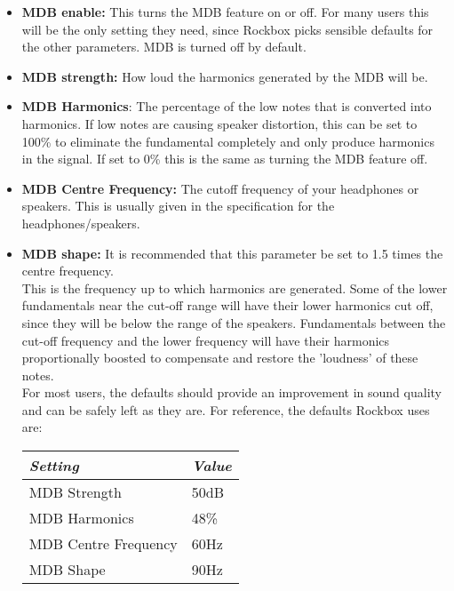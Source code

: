 \begin{itemize}
\begin{itemize}
\item \textbf{MDB enable: } This turns the MDB feature on or off.  For many
users this will be the only setting they need, since Rockbox picks
sensible defaults for the other parameters.  MDB is turned off by
default.
\item \textbf{MDB strength:} How loud the harmonics generated by the MDB will
be.
\item \textbf{MDB Harmonics}: The percentage of the low notes that is
converted into harmonics.  If low notes are causing speaker distortion,
this can be set to 100\% to eliminate the fundamental completely and
only produce harmonics in the signal.  If set to 0\% this is the same
as turning the MDB feature off.
\item \textbf{MDB Centre Frequency: }The cutoff frequency of your headphones or speakers.  This is usually given in the specification for the headphones/speakers.
\item \textbf{MDB shape: }It is recommended that this parameter be set to 1.5
times the centre frequency.\\

This is the frequency up to which harmonics are generated.  Some of the
lower fundamentals near the cut{}-off range
will have their lower harmonics cut off, since they will be below the
range of the speakers. Fundamentals between the
cut{}-off frequency and the lower frequency will have their harmonics proportionally boosted to compensate and restore the 'loudness' of these
notes.\\

For most users, the defaults should provide an improvement in sound
quality and can be safely left as they are.  For reference, the
defaults Rockbox uses are:


\begin{tabular}[c]{|p{4.5290003cm}|p{1.56cm}|}
\hline
{\centering\bfseries\itshape
Setting 
\par}
&
{\centering\bfseries\itshape
Value 
\par}
\\\hline
{\centering\upshape
MDB Strength 
\par}
&
50dB 
\\\hline
{\centering\upshape
MDB Harmonics 
\par}
&
48\% 
\\\hline
{\centering\upshape
MDB Centre Frequency 
\par}
&
60Hz 
\\\hline
{\centering\upshape
MDB Shape 
\par}
&
90Hz
\\\hline
\end{tabular}

\end{itemize}
\end{itemize}

